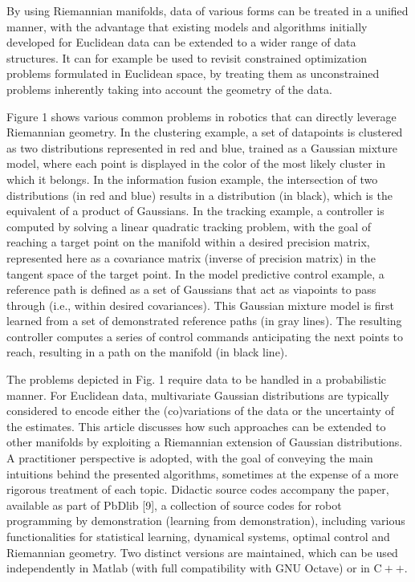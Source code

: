 \documentclass[10pt]{article}
\begin{document}
By using Riemannian manifolds, data of various forms can be treated in a unified manner, with the advantage that existing models and algorithms initially developed for Euclidean data can be extended to a wider range of data structures. It can for example be used to revisit constrained optimization problems formulated in Euclidean space, by treating them as unconstrained problems inherently taking into account the geometry of the data.

Figure 1 shows various common problems in robotics that can directly leverage Riemannian geometry. In the clustering example, a set of datapoints is clustered as two distributions represented in red and blue, trained as a Gaussian mixture model, where each point is displayed in the color of the most likely cluster in which it belongs. In the information fusion example, the intersection of two distributions (in red and blue) results in a distribution (in black), which is the equivalent of a product of Gaussians. In the tracking example, a controller is computed by solving a linear quadratic tracking problem, with the goal of reaching a target point on the manifold within a desired precision matrix, represented here as a covariance matrix (inverse of precision matrix) in the tangent space of the target point. In the model predictive control example, a reference path is defined as a set of Gaussians that act as viapoints to pass through (i.e., within desired covariances). This Gaussian mixture model is first learned from a set of demonstrated reference paths (in gray lines). The resulting controller computes a series of control commands anticipating the next points to reach, resulting in a path on the manifold (in black line).

The problems depicted in Fig. 1 require data to be handled in a probabilistic manner. For Euclidean data, multivariate Gaussian distributions are typically considered to encode either the (co)variations of the data or the uncertainty of the estimates. This article discusses how such approaches can be extended to other manifolds by exploiting a Riemannian extension of Gaussian distributions. A practitioner perspective is adopted, with the goal of conveying the main intuitions behind the presented algorithms, sometimes at the expense of a more rigorous treatment of each topic. Didactic source codes accompany the paper, available as part of PbDlib [9], a collection of source codes for robot programming by demonstration (learning from demonstration), including various functionalities for statistical learning, dynamical systems, optimal control and Riemannian geometry. Two distinct versions are maintained, which can be used independently in Matlab (with full compatibility with GNU Octave) or in $\mathrm{C}++$.
\end{document}
